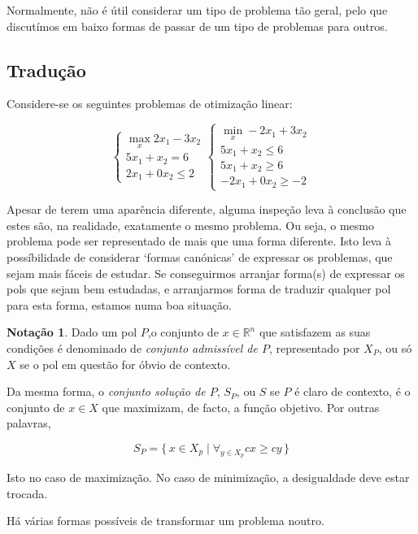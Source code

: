 \documentclass{article}
\newcommand{\R}{\mathbb{R}}
\theoremstyle{definition}
\newtheorem*{notacao}{Notação}
\begin{document}
	Normalmente, não é útil considerar um tipo de problema tão geral, pelo que discutímos em baixo formas de passar de um tipo de problemas para outros.
	
	\subsection{Tradução}
	
	Considere-se os seguintes problemas de otimização linear:
	
	\[
	\begin{cases}
	\max\limits_x 2x_1 - 3x_2 \\
	5x_1 + x_2 = 6 \\
	2x_1 + 0x_2 \leq 2
	\end{cases}
	\begin{cases}
	\min\limits_x -2x_1 + 3x_2 \\
	5x_1 + x_2 \leq 6 \\
	5x_1 + x_2 \geq 6 \\
	-2x_1 + 0x_2 \geq -2
	\end{cases}
	\]
	
	Apesar de terem uma aparência diferente, alguma inspeção leva à conclusão que estes são, na realidade, exatamente o mesmo problema. Ou seja, o mesmo problema pode ser representado de mais que uma forma diferente. Isto leva à possíbilidade de considerar `formas canónicas' de expressar os problemas, que sejam mais fáceis de estudar. Se conseguirmos arranjar forma(s) de expressar os pols que sejam bem estudadas, e arranjarmos forma de traduzir qualquer pol para esta forma, estamos numa boa situação.
	
	\begin{notacao}
	Dado um pol $P$,o conjunto de $x \in \R^n$ que satisfazem as suas condições é denominado de \emph{conjunto admissível de $P$}, representado por $X_P$, ou só $X$ se o pol em questão for óbvio de contexto.
	
	Da mesma forma, o \emph{conjunto solução de $P$}, $S_P$, ou $S$ se $P$ é claro de contexto, é o conjunto de $x \in X$ que maximizam, de facto, a função objetivo. Por outras palavras,
	
	\[S_P = \{\,x \in X_p \mid \forall_{y \in X_p} cx \geq cy\,\}\]
	
	Isto no caso de maximização. No caso de minimização, a desigualdade deve estar trocada.
	\end{notacao}
	
	Há várias formas possíveis de transformar um problema noutro.
	
\end{document}
